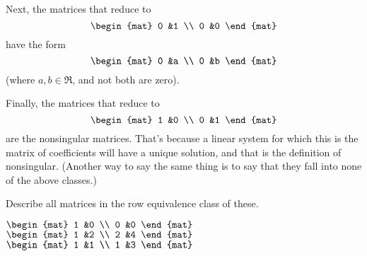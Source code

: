 \begin{exercises}
\begin{answer}
       Next, the matrices that reduce to 
       \begin{equation*}
         \begin{mat}
           0  &1  \\
           0  &0
         \end{mat}
       \end{equation*}
       have the form
       \begin{equation*}
         \begin{mat}
           0  &a \\
           0  &b
         \end{mat}
       \end{equation*}
       (where \( a,b\in\Re \), and not both are zero).  

       Finally, the matrices that reduce to 
       \begin{equation*}
         \begin{mat}
           1  &0  \\
           0  &1
         \end{mat}
       \end{equation*}
       are the nonsingular matrices.
       That's because a linear system for which this is the matrix of
       coefficients will have a unique solution, and that is the definition
       of nonsingular.
       (Another way to say the same thing is to say that they fall into none
       of the above classes.)
     \end{answer}
  \item 
    Describe all matrices in the row equivalence class of
    these.
    \begin{exparts*}
       \partsitem  \(
           \begin{mat}
             1  &0  \\
             0  &0
           \end{mat}  \)
       \partsitem  \(
           \begin{mat}
             1  &2      \\
             2  &4
           \end{mat} \)
       \partsitem \(
           \begin{mat}
             1  &1      \\
             1  &3
           \end{mat} \)
    \end{exparts*}
    \begin{answer}
      \begin{exparts}

\end{exparts}
\end{answer}
\end{exercises}
